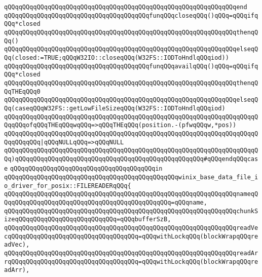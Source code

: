 \verb|qQQqqQQqqQQqqQQqqQQqqQQqqQQqqQQqqQQqqQQqqQQqqQQqqQQqqQQqqQQqqQQqend|\newline
\verb|qQQqqQQqqQQqqQQqqQQqqQQqqQQqqQQqqQQqqQQqfunqQQqcloseqQQq()qQQq=qQQqifqQQq*closed|\newline
\verb|qQQqqQQqqQQqqQQqqQQqqQQqqQQqqQQqqQQqqQQqqQQqqQQqqQQqqQQqqQQqqQQqthenqQQq()|\newline
\verb|qQQqqQQqqQQqqQQqqQQqqQQqqQQqqQQqqQQqqQQqqQQqqQQqqQQqqQQqqQQqqQQqelseqQQq(closed:=TRUE;qQQqW32IO::closeqQQq(W32FS::IODToHndlqQQqiod))|\newline
\verb|qQQqqQQqqQQqqQQqqQQqqQQqqQQqqQQqqQQqqQQqfunqQQqavailqQQq()qQQq=qQQqifqQQq*closed|\newline
\verb|qQQqqQQqqQQqqQQqqQQqqQQqqQQqqQQqqQQqqQQqqQQqqQQqqQQqqQQqqQQqqQQqthenqQQqTHEqQQq0|\newline
\verb|qQQqqQQqqQQqqQQqqQQqqQQqqQQqqQQqqQQqqQQqqQQqqQQqqQQqqQQqqQQqqQQqelseqQQq(caseqQQqW32FS::getLowFileSizeqQQq(W32FS::IODToHndlqQQqiod)|\newline
\verb|qQQqqQQqqQQqqQQqqQQqqQQqqQQqqQQqqQQqqQQqqQQqqQQqqQQqqQQqqQQqqQQqqQQqqQQqqQQqofqQQqTHEqQQqwqQQq=>qQQqTHEqQQq(position.-(pfwqQQqw,*pos))|\newline
\verb|qQQqqQQqqQQqqQQqqQQqqQQqqQQqqQQqqQQqqQQqqQQqqQQqqQQqqQQqqQQqqQQqqQQqqQQqqQQqqQQq|\verb#|qQQqNULLqQQq=>qQQqNULL#\newline
\verb|qQQqqQQqqQQqqQQqqQQqqQQqqQQqqQQqqQQqqQQqqQQqqQQqqQQqqQQqqQQqqQQqqQQqqQQq)qQQqqQQqqQQqqQQqqQQqqQQqqQQqqQQqqQQqqQQqqQQqqQQqqQQq#qQQqendqQQqcase|\newline
\verb|qQQqqQQqqQQqqQQqqQQqqQQqqQQqqQQqqQQqqQQqin|\newline
\verb|qQQqqQQqqQQqqQQqqQQqqQQqqQQqqQQqqQQqqQQqqQQqqQQqwinix_base_data_file_io_driver_for_posix::FILEREADERqQQq{|\newline
\verb|qQQqqQQqqQQqqQQqqQQqqQQqqQQqqQQqqQQqqQQqqQQqqQQqqQQqqQQqqQQqqQQqnameqQQqqQQqqQQqqQQqqQQqqQQqqQQqqQQqqQQqqQQqqQQqqQQq=qQQqname,|\newline
\verb|qQQqqQQqqQQqqQQqqQQqqQQqqQQqqQQqqQQqqQQqqQQqqQQqqQQqqQQqqQQqqQQqchunkSizeqQQqqQQqqQQqqQQqqQQqqQQqqQQq=qQQqbufferSzB,|\newline
\verb|qQQqqQQqqQQqqQQqqQQqqQQqqQQqqQQqqQQqqQQqqQQqqQQqqQQqqQQqqQQqqQQqreadVecqQQqqQQqqQQqqQQqqQQqqQQqqQQqqQQqqQQq=qQQqwithLockqQQq(blockWrapqQQqreadVec),|\newline
\verb|qQQqqQQqqQQqqQQqqQQqqQQqqQQqqQQqqQQqqQQqqQQqqQQqqQQqqQQqqQQqqQQqreadArrqQQqqQQqqQQqqQQqqQQqqQQqqQQqqQQqqQQq=qQQqwithLockqQQq(blockWrapqQQqreadArr),|\newline
